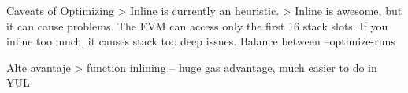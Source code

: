 Caveats of Optimizing
> Inline is currently an heuristic.
> Inline is awesome, but it can cause problems. The EVM can access only the first 16 stack slots. If you inline too much, it causes stack too deep issues. Balance between --optimize-runs


Alte avantaje
> function inlining – huge gas advantage, much easier to do in YUL 